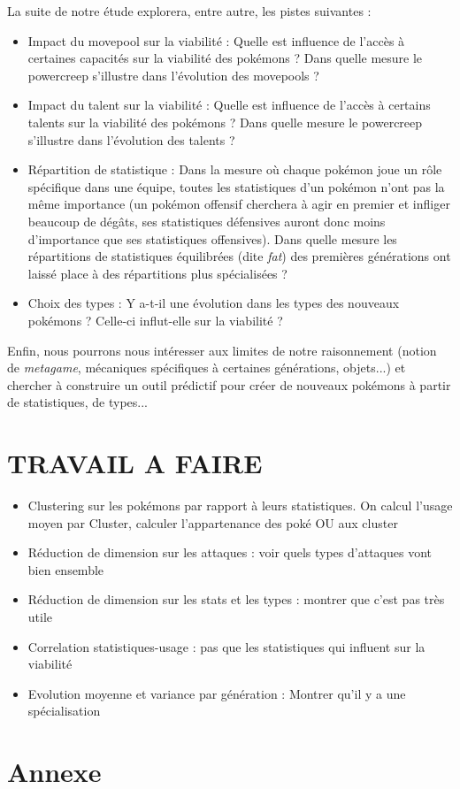 \documentclass[a4paper,12pt]{article}
\begin{document}
La suite de notre étude explorera, entre autre, les pistes suivantes :
\begin{itemize}
    \item Impact du movepool sur la viabilité : Quelle est influence de l'accès
    à certaines capacités sur la viabilité des pokémons ? Dans quelle mesure le
    powercreep s'illustre dans l'évolution des movepools ?
    \item Impact du talent sur la viabilité : Quelle est influence de l'accès à
    certains talents sur la viabilité des pokémons ? Dans quelle mesure le
    powercreep s'illustre dans l'évolution des talents ?
    \item Répartition de statistique : Dans la mesure où chaque pokémon joue un
    rôle spécifique dans une équipe, toutes les statistiques d'un pokémon n'ont
    pas la même importance (un pokémon offensif cherchera à agir en premier et
    infliger beaucoup de dégâts, ses statistiques défensives auront donc moins
    d'importance que ses statistiques offensives). Dans quelle mesure les
    répartitions de statistiques équilibrées (dite \textit{fat}) des premières
    générations ont laissé place à des répartitions plus spécialisées ?
    \item Choix des types : Y a-t-il une évolution dans les types des nouveaux
    pokémons ? Celle-ci influt-elle sur la viabilité ?
\end{itemize}

Enfin, nous pourrons nous intéresser aux limites de notre raisonnement (notion
de \textit{metagame}, mécaniques spécifiques à certaines générations, objets...)
et chercher à construire un outil prédictif pour créer de nouveaux pokémons à
partir de statistiques, de types...


\section{TRAVAIL A FAIRE}

\begin{itemize}
    \item Clustering sur les pokémons par rapport à leurs statistiques. On
    calcul l'usage moyen par Cluster, calculer l'appartenance des poké OU aux
    cluster
    \item Réduction de dimension sur les attaques : voir quels types d'attaques
    vont bien ensemble
    \item Réduction de dimension sur les stats et les types : montrer que c'est
    pas très utile
    \item Correlation statistiques-usage : pas que les statistiques qui influent
    sur la viabilité
    \item Evolution moyenne et variance par génération : Montrer qu'il y a une
    spécialisation
\end{itemize}
\section{Annexe}
\end{document}
